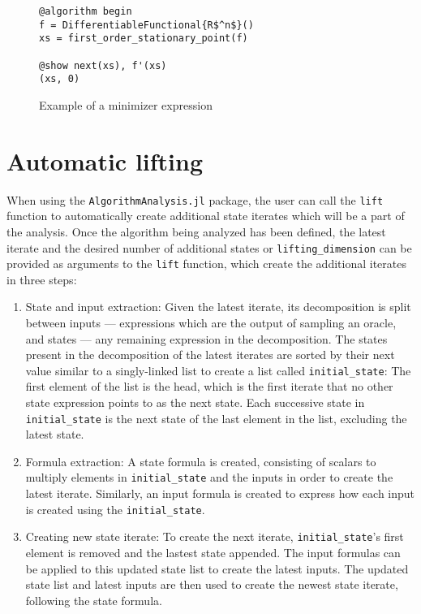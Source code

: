 \begin{figure}[h!]
	\begin{lstlisting}[mathescape]
@algorithm begin
f = DifferentiableFunctional{R$^n$}()
xs = first_order_stationary_point(f)

@show next(xs), f'(xs)
(xs, 0)

\end{lstlisting}
\caption{Example of a minimizer expression}
\label{ex_minimizer}
\end{figure}

\section{Automatic lifting}

When using the \texttt{AlgorithmAnalysis.jl} package, the user can call the \texttt{lift} function to automatically create additional state iterates which will be a part of the analysis. Once the algorithm being analyzed has been defined, the latest iterate and the desired number of additional states or \texttt{lifting\_dimension} can be provided as arguments to the \texttt{lift} function, which create the additional iterates in three steps:

\begin{enumerate}
	\item State and input extraction: Given the latest iterate, its decomposition is split between inputs --- expressions which are the output of sampling an oracle, and states --- any remaining expression in the decomposition. The states present in the decomposition of the latest iterates are sorted by their next value similar to a singly-linked list to create a list called \texttt{initial\_state}: The first element of the list is the head, which is the first iterate that no other state expression points to as the next state. Each successive state in \texttt{initial\_state} is the next state of the last element in the list, excluding the latest state.
	\item Formula extraction: A state formula is created, consisting of scalars to multiply elements in \texttt{initial\_state} and the inputs in order to create the latest iterate. Similarly, an input formula is created to express how each input is created using the \texttt{initial\_state}.
	\item Creating new state iterate: To create the next iterate, \texttt{initial\_state}'s first element is removed and the lastest state appended. The input formulas can be applied to this updated state list to create the latest inputs. The updated state list and latest inputs are then used to create the newest state iterate, following the state formula. 
\end{enumerate}

